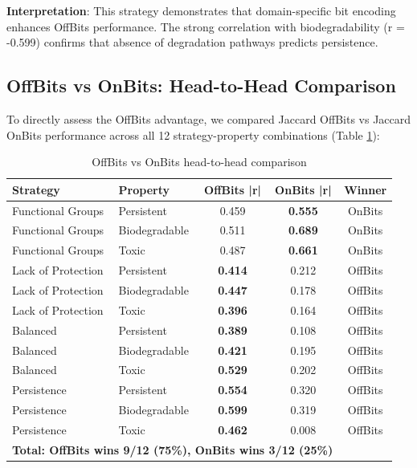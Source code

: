 \documentclass[11pt,letterpaper]{article}
\begin{document}
\textbf{Interpretation}: This strategy demonstrates that domain-specific bit encoding enhances OffBits performance. The strong correlation with biodegradability (r = -0.599) confirms that absence of degradation pathways predicts persistence.

\subsection{OffBits vs OnBits: Head-to-Head Comparison}

To directly assess the OffBits advantage, we compared Jaccard OffBits vs Jaccard OnBits performance across all 12 strategy-property combinations (Table \ref{tab:offbits_vs_onbits}):

\begin{table}[H]
\centering
\caption{OffBits vs OnBits head-to-head comparison}
\label{tab:offbits_vs_onbits}
\small
\begin{tabular}{llccc}
\toprule
\textbf{Strategy} & \textbf{Property} & \textbf{OffBits |r|} & \textbf{OnBits |r|} & \textbf{Winner} \\
\midrule
Functional Groups & Persistent & 0.459 & \textbf{0.555} & OnBits \\
Functional Groups & Biodegradable & 0.511 & \textbf{0.689} & OnBits \\
Functional Groups & Toxic & 0.487 & \textbf{0.661} & OnBits \\
Lack of Protection & Persistent & \textbf{0.414} & 0.212 & OffBits \\
Lack of Protection & Biodegradable & \textbf{0.447} & 0.178 & OffBits \\
Lack of Protection & Toxic & \textbf{0.396} & 0.164 & OffBits \\
Balanced & Persistent & \textbf{0.389} & 0.108 & OffBits \\
Balanced & Biodegradable & \textbf{0.421} & 0.195 & OffBits \\
Balanced & Toxic & \textbf{0.529} & 0.202 & OffBits \\
Persistence & Persistent & \textbf{0.554} & 0.320 & OffBits \\
Persistence & Biodegradable & \textbf{0.599} & 0.319 & OffBits \\
Persistence & Toxic & \textbf{0.462} & 0.008 & OffBits \\
\midrule
\multicolumn{4}{l}{\textbf{Total: OffBits wins 9/12 (75\%), OnBits wins 3/12 (25\%)}} \\
\bottomrule
\end{tabular}
\end{table}
\end{document}
